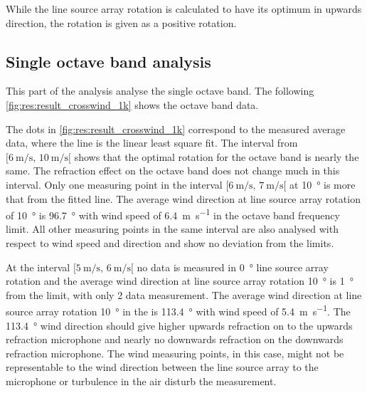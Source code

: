While the line source array rotation is calculated to have its optimum in upwards direction, the rotation is given as a positive rotation. 


\subsection{Single octave band analysis}\label{res:ana:single}
This part of the analysis analyse the single octave band. The following \autoref{fig:res:result_crosswind_1k}  shows the  octave band data.  

 

 
 The dots in \autoref{fig:res:result_crosswind_1k} correspond to the measured average data, where the line is the linear least square fit. The interval from $[\SI{6}{\meter\per\second},\, \SI{10}{\meter\per\second}[ $ shows that the optimal rotation for the  octave band is nearly the same. The refraction effect on the   octave band does not change much in this interval. Only one measuring point in the interval $[\SI{6}{\meter\per\second},\, \SI{7}{\meter\per\second}[ $ at \SI{10}{\degree} is more that  from the fitted line. The average wind direction at line source array rotation of \SI{10}{\degree} is \SI{96.7}{\degree} with wind speed of \SI{6.4}{\meter\per\second} in the  octave band frequency limit. All other measuring points in the same interval are also analysed with respect to wind speed and direction and show no deviation from the limits. 

At the interval $[\SI{5}{\meter\per\second},\, \SI{6}{\meter\per\second}[ $ no data is measured in \SI{0}{\degree} line source array rotation and the average wind direction at line source array rotation \SI{10}{\degree} is \SI{1}{\degree} from the limit, with only 2 data measurement. The average wind direction at line source array rotation \SI{10}{\degree} in the  is \SI{113.4}{\degree} with wind speed of \SI{5.4}{\meter\per\second}. The \SI{113.4}{\degree} wind direction should give higher upwards refraction on to the upwards refraction microphone and nearly no downwards refraction on the downwards refraction microphone. The wind measuring points, in this case, might not be representable to the wind direction between the line source array to the microphone or turbulence in the air disturb the measurement. 


